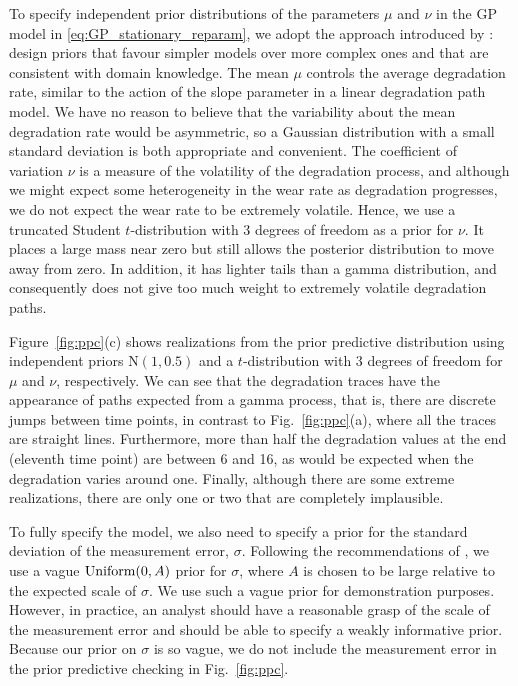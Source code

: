 \documentclass{article}
\begin{document}
To specify independent prior distributions of the parameters $\mu$ and $\nu$ in the GP model in  \eqref{eq:GP_stationary_reparam}, we adopt the approach introduced by \citet{Simpson_2017}: design priors that favour simpler models over more complex ones and that are consistent with domain knowledge. The mean $\mu$ controls the average degradation rate, similar to the action of the slope parameter in a linear degradation path model. We have no reason to believe that the variability about the mean degradation rate would be asymmetric, so a Gaussian distribution with a small standard deviation is both appropriate and convenient. The coefficient of variation $\nu$ is a measure of the volatility of the degradation process, and although we might expect some heterogeneity in the wear rate as degradation progresses, we do not expect the wear rate to be extremely volatile. Hence, we use a truncated Student $t$-distribution with 3 degrees of freedom as a prior for $\nu$. It places a large mass near zero but still allows the posterior distribution to move away from zero. In addition, it has lighter tails than a gamma distribution, and consequently does not give too much weight to extremely volatile degradation paths. 

Figure~\ref{fig:ppc}(c) shows realizations from the prior predictive distribution using independent priors $\mbox{N}(1, 0.5)$ and a $t$-distribution with 3 degrees of freedom for $\mu$ and $\nu$, respectively. We can see that the degradation traces have the appearance of paths expected from a gamma process, that is, there are discrete jumps between time points, in contrast to Fig.~\ref{fig:ppc}(a), where all the traces are straight lines. Furthermore, more than half the degradation values at the end (eleventh time point) are between 6 and 16, as would be expected when the degradation varies around one. Finally, although there are some extreme realizations, there are only one or two that are completely implausible. 

To fully specify the model, we also need to specify a prior for the standard deviation of the measurement error, $\sigma$. Following the recommendations of \citet[Chapter~17]{gelman_bayesian_2020}, we use a vague $\hbox{Uniform}(0, A)$ prior for $\sigma$, where $A$ is chosen to be large relative to the expected scale of $\sigma$. We use such a vague prior for demonstration purposes. However, in practice, an analyst should have a reasonable grasp of the scale of the measurement error and should be able to specify a weakly informative prior. Because our prior on $\sigma$ is so vague, we do not include the measurement error in the prior predictive checking in Fig.~\ref{fig:ppc}.
\end{document}
